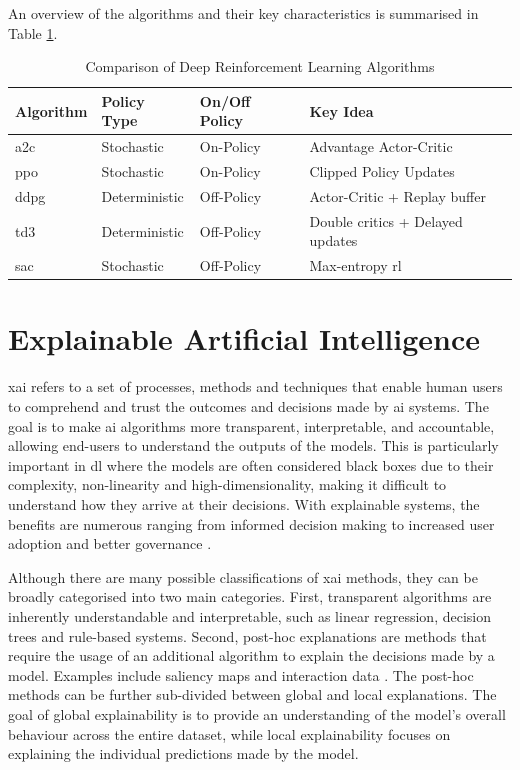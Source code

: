 An overview of the algorithms and their key characteristics is summarised in Table \ref{tab:drl_algorithms_comparison}. 

\begin{table}[h]
    \centering
    \begin{tabular}{|l|l|l|l|}
        \hline
        Algorithm & Policy Type & On/Off Policy & Key Idea \\
        \hline
        \acrshort{a2c} & Stochastic & On-Policy & Advantage Actor-Critic \\
        \acrshort{ppo} & Stochastic & On-Policy & Clipped Policy Updates \\
        \acrshort{ddpg} & Deterministic & Off-Policy & Actor-Critic + Replay buffer \\
        \acrshort{td3} & Deterministic & Off-Policy & Double critics + Delayed updates \\
        \acrshort{sac} & Stochastic & Off-Policy & Max-entropy \acrshort{rl} \\
        \hline
    \end{tabular}
    \caption{Comparison of Deep Reinforcement Learning Algorithms}
    \label{tab:drl_algorithms_comparison}
\end{table}

\section{Explainable Artificial Intelligence} \label{sec:explainableai}

\acrfull{xai} refers to a set of processes, methods and techniques that enable human users to comprehend and trust the outcomes and decisions made by \acrfull{ai} systems. The goal is to make \acrshort{ai} algorithms more transparent, interpretable, and accountable, allowing end-users to understand the outputs of the models. This is particularly important in \acrfull{dl} where the models are often considered black boxes  due to their complexity, non-linearity and high-dimensionality, making it difficult to understand how they arrive at their decisions. With explainable systems, the benefits are numerous ranging from informed decision making to increased user adoption and better governance \cite{Phillips2021}. 

Although there are many possible classifications of \acrshort{xai} methods, they can be broadly categorised into two main categories. First, transparent algorithms are inherently understandable and interpretable, such as linear regression, decision trees and rule-based systems. Second, post-hoc explanations are methods that require the usage of an additional algorithm to explain the decisions made by a model. Examples include saliency maps \cite{Sequeira2020} and interaction data \cite{Greydanus2018}. The post-hoc methods can be further sub-divided between global and local explanations. The goal of global explainability is to provide an understanding of the model's overall behaviour across the entire dataset, while local explainability focuses on explaining the individual predictions made by the model.

